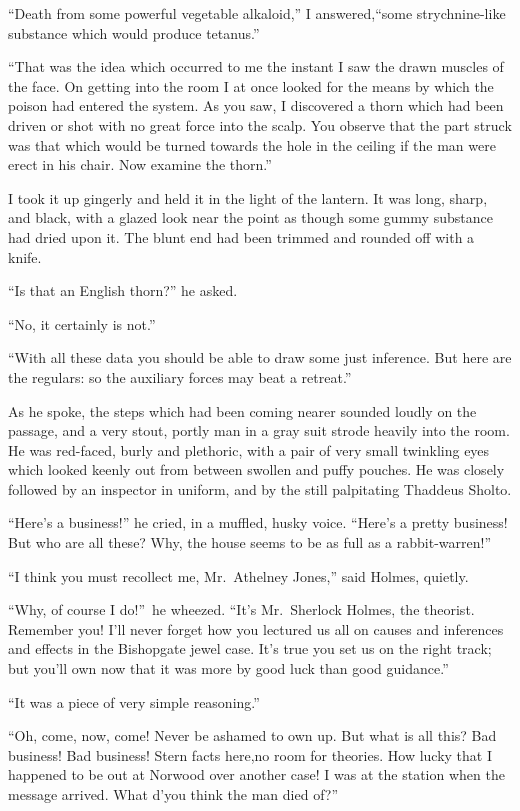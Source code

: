 \documentclass[12pt,english,oneside]{book}
\begin{document}
{}``Death from some powerful vegetable alkaloid,'' I answered,\mdsh{---}``some
strychnine-like substance which would produce tetanus.''

{}``That was the idea which occurred to me the instant I saw the
drawn muscles of the face. On getting into the room I at once looked
for the means by which the poison had entered the system. As you saw,
I discovered a thorn which had been driven or shot with no great force
into the scalp. You observe that the part struck was that which would
be turned towards the hole in the ceiling if the man were erect in
his chair. Now examine the thorn.''

I took it up gingerly and held it in the light of the lantern. It
was long, sharp, and black, with a glazed look near the point as though
some gummy substance had dried upon it. The blunt end had been trimmed
and rounded off with a knife.

{}``Is that an English thorn?'' he asked.

{}``No, it certainly is not.''

{}``With all these data you should be able to draw some just inference.
But here are the regulars: so the auxiliary forces may beat a retreat.''

As he spoke, the steps which had been coming nearer sounded loudly
on the passage, and a very stout, portly man in a gray suit strode
heavily into the room. He was red-faced, burly and plethoric, with
a pair of very small twinkling eyes which looked keenly out from between
swollen and puffy pouches. He was closely followed by an inspector
in uniform, and by the still palpitating Thaddeus Sholto.

{}``Here's a business!'' he cried, in a muffled, husky voice. {}``Here's
a pretty business! But who are all these? Why, the house seems to
be as full as a rabbit-warren!''

{}``I think you must recollect me, Mr.\ Athelney Jones,'' said
Holmes, quietly.

{}``Why, of course I do!''\ he wheezed. {}``It's Mr.\ Sherlock
Holmes, the theorist. Remember you! I'll never forget how you lectured
us all on causes and inferences and effects in the Bishopgate jewel
case. It's true you set us on the right track; but you'll own now
that it was more by good luck than good guidance.''

{}``It was a piece of very simple reasoning.''

{}``Oh, come, now, come! Never be ashamed to own up. But what is
all this? Bad business! Bad business! Stern facts here,\mdsh{---}no
room for theories. How lucky that I happened to be out at Norwood
over another case! I was at the station when the message arrived.
What d'you think the man died of?''
\end{document}

